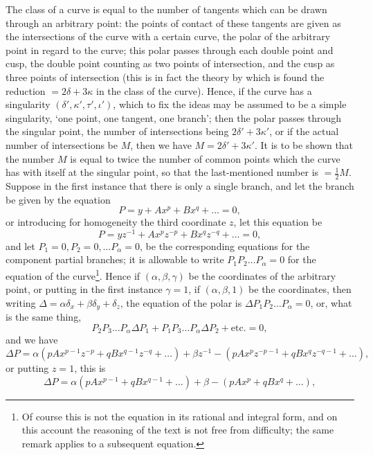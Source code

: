 \documentclass[11pt]{article}
\begin{document}
The class of a curve is equal to the number of tangents which can be drawn through an arbitrary point: the points of contact of these tangents are given as the intersections of the curve with a certain curve, the polar of the arbitrary point in regard to the curve; this polar passes through each double point and cusp, the double point counting as two points of intersection, and the cusp as three points of intersection (this is in fact the theory by which is found the reduction $= 2\delta + 3\kappa$ in the class of the curve). Hence, if the curve has a singularity $(\delta', \kappa', \tau', \iota')$, which to fix the ideas may be assumed to be a simple singularity, `one point, one tangent, one branch'; then the polar passes through the singular point, the number of intersections being $2\delta' + 3\kappa'$, or if the actual number of intersections be $M$, then we have $M = 2\delta' + 3\kappa'$. It is to be shown that the number $M$ is equal to twice the number of common points which the curve has with itself at the singular point, so that the last-mentioned number is $= \tfrac{1}{2}M$. Suppose in the first instance that there is only a single branch, and let the branch be given by the equation
\[ P = y + A x^p + B x^q + \ldots = 0, \]
or introducing for homogeneity the third coordinate $z$, let this equation be
\[ P = y z^{-1} + A x^p z^{-p} + B x^q z^{-q} + \ldots = 0, \]
and let $P_1 = 0, P_2 = 0, \ldots P_\alpha = 0$, be the corresponding equations for the component partial branches; it is allowable to write $P_1 P_2 \ldots P_\alpha = 0$ for the equation of the curve\footnote{Of course this is not the equation in its rational and integral form, and on this account the reasoning of the text is not free from difficulty; the same remark applies to a subsequent equation.}. Hence if $(\alpha, \beta, \gamma)$ be the coordinates of the arbitrary point, or putting in the first instance $\gamma = 1$, if $(\alpha, \beta, 1)$ be the coordinates, then writing $\Delta = \alpha\delta_x + \beta\delta_y + \delta_z$, the equation of the polar is $\Delta P_1 P_2 \ldots P_\alpha = 0$, or, what is the same thing,
\[ P_2 P_3 \ldots P_\alpha \Delta P_1 + P_1 P_3 \ldots P_\alpha \Delta P_2 + \text{etc.} = 0, \]
and we have
\[ \Delta P = \alpha (p A x^{p-1} z^{-p} + q B x^{q-1} z^{-q} + \ldots) + \beta z^{-1} - (p A x^p z^{-p-1} + q B x^q z^{-q-1} + \ldots), \]
or putting $z = 1$, this is
\[ \Delta P = \alpha (p A x^{p-1} + q B x^{q-1} + \ldots) + \beta - (p A x^p + q B x^q + \ldots), \]
\end{document}

